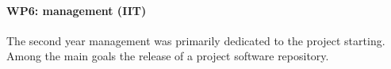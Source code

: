 \paragraph{WP6: management (IIT)}

The second year management was primarily dedicated to the project starting. Among the main goals the release of a project software repository.
